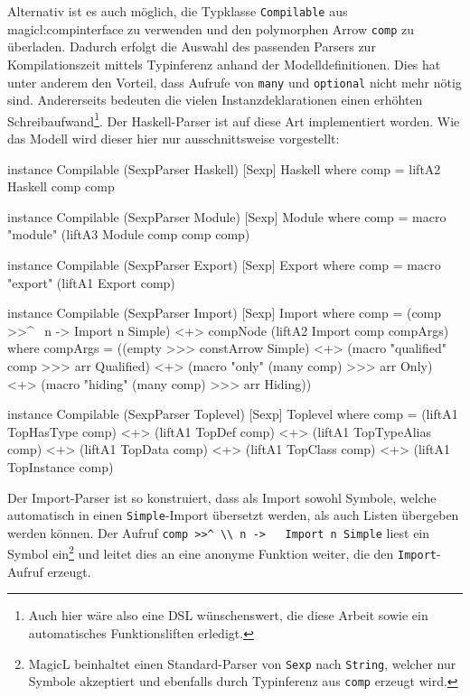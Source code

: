\documentclass[12pt, a4paper, bibgerm]{scrbook}
\newenvironment{DIFnomarkup}{}{}
\newcommand\icode[1]{\lstinline?#1?}
\newcommand\sref{}
\begin{document}
Alternativ ist es auch möglich, die Typklasse \icode{Compilable} aus
\sref{magicl:compinterface} zu verwenden und den polymorphen Arrow
\icode{comp} zu überladen. Dadurch erfolgt die Auswahl des passenden
Parsers zur Kompilationszeit mittels Typinferenz anhand der
Modelldefinitionen. Dies hat unter anderem den Vorteil, dass Aufrufe von
\icode{many} und \icode{optional} nicht mehr nötig sind. Andererseits
bedeuten die vielen Instanzdeklarationen einen erhöhten
Schreibaufwand\footnote{Auch hier wäre also eine DSL wünschenswert, die
  diese Arbeit sowie ein automatisches Funktionsliften erledigt.}. Der
Haskell-Parser ist auf diese Art implementiert worden. Wie das Modell
wird dieser hier nur ausschnittsweise vorgestellt:
\begin{DIFnomarkup}\begin{code}
instance Compilable (SexpParser Haskell) [Sexp] Haskell where
    comp = liftA2 Haskell comp comp

instance Compilable (SexpParser Module) [Sexp] Module where
    comp = macro "module" (liftA3 Module comp comp comp)

instance Compilable (SexpParser Export) [Sexp] Export where
    comp = macro "export" (liftA1 Export comp)



instance Compilable (SexpParser Import) [Sexp] Import where
    comp  = (comp >>^ \ n -> Import n Simple) <+>
             compNode (liftA2 Import comp compArgs)
        where compArgs =
                  ((empty >>> constArrow Simple)               <+>
                   (macro "qualified" comp >>> arr Qualified)  <+>
                   (macro "only" (many comp) >>> arr Only)     <+>
                   (macro "hiding" (many comp) >>> arr Hiding))

instance Compilable (SexpParser Toplevel) [Sexp] Toplevel where
    comp = (liftA1 TopHasType comp)   <+>
           (liftA1 TopDef comp)       <+>
           (liftA1 TopTypeAlias comp) <+>
           (liftA1 TopData comp)      <+>
           (liftA1 TopClass comp)     <+>
           (liftA1 TopInstance comp)
\end{code}\end{DIFnomarkup}
Der Import-Parser ist so konstruiert, dass als Import sowohl Symbole,
welche automatisch in einen \icode{Simple}-Import übersetzt werden, als
auch Listen übergeben werden können. Der Aufruf \icode{comp >>^ \\ n ->
  Import n Simple} liest ein Symbol ein\footnote{MagicL beinhaltet einen
Standard-Parser von \icode{Sexp} nach \icode{String}, welcher nur
Symbole akzeptiert und ebenfalls durch Typinferenz aus \icode{comp}
erzeugt wird.} und leitet dies an eine anonyme Funktion weiter, die den
\icode{Import}-Aufruf erzeugt.
\end{document}
